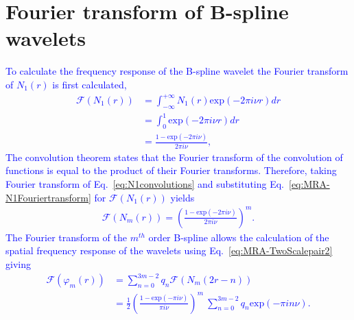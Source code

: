 \documentclass[review,authoryear,3p]{elsarticle}
\newcommand{\parham}[1]{\textcolor{blue}{#1}}
\begin{document}
\section{Fourier transform of B-spline wavelets}\label{ap:FourierofBsplines}
\parham{To calculate the frequency response of the B-spline wavelet the Fourier transform of $N_1(r)$ is first calculated, 
\begin{align}\label{eq:MRA-N1Fouriertransform}
\mathcal F(N_1(r))&=\int_{-\infty}^{+\infty}N_1(r)\mathrm{exp}(-2\pi i \nu r)dr \nonumber \\
&=\int_{0}^{1} \mathrm{exp}(-2\pi i \nu r)dr \nonumber \\
&=\frac{1-\mathrm{exp}(-2\pi i \nu)}{2\pi i\nu},
\end{align}
The convolution theorem states that the Fourier transform of the convolution of functions is equal to the product of their Fourier transforms. Therefore, taking Fourier transform of Eq.~\eqref{eq:N1convolutions} and substituting Eq.~\eqref{eq:MRA-N1Fouriertransform} for $\mathcal F(N_1(r)) $ yields
\begin{align}\label{eq:MRA-NmFouriertransform}
\mathcal F(N_m(r))=\left(\frac{1-\mathrm{exp}(-2\pi i \nu)}{2\pi i\nu}\right)^{m}.
\end{align}
The Fourier transform of the $m^{th}$ order B-spline allows the calculation of the spatial frequency response of the wavelets using Eq.~\eqref{eq:MRA-TwoScalepair2} giving
\begin{align}      
	  \mathcal{F}(\varphi_{m}\left(r\right)) &= \sum_{n=0}^{3m-2}  q_n \mathcal{F}\left(N_{m}\left(2r-n\right)\right) \nonumber\\
	&=\frac{1}{2}\left(\frac{1-\mathrm{exp}(-\pi i \nu)}{\pi i\nu}\right)^m~\sum_{n=0}^{3m-2}  q_n \mathrm{exp}(-\pi in\nu).\label{app:MRA-Wavelettransform}
\end{align} }
\end{document}
